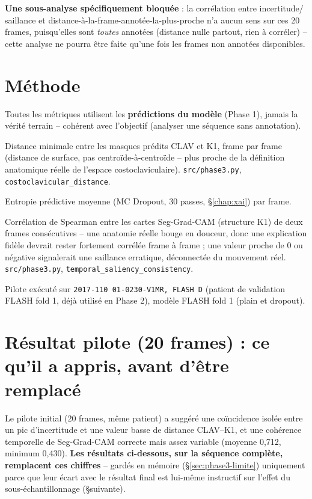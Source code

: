 \documentclass[11pt,a4paper]{report}
\begin{document}
\textbf{Une sous-analyse spécifiquement bloquée} : la corrélation entre incertitude/
saillance et distance-à-la-frame-annotée-la-plus-proche n'a aucun sens sur ces 20
frames, puisqu'elles sont \emph{toutes} annotées (distance nulle partout, rien à
corréler) -- cette analyse ne pourra être faite qu'une fois les frames non
annotées disponibles.

\section{Méthode}

Toutes les métriques utilisent les \textbf{prédictions du modèle} (Phase 1), jamais
la vérité terrain -- cohérent avec l'objectif (analyser une séquence sans
annotation).

\begin{description}[style=nextline]
    \item[Courbe de compression costoclaviculaire] Distance minimale entre les
        masques prédits CLAV et K1, frame par frame (distance de surface, pas
        centroïde-à-centroïde -- plus proche de la définition anatomique réelle de
        l'espace costoclaviculaire). \texttt{src/phase3.py},
        \texttt{costoclavicular\_distance}.
    \item[Incertitude au cours du temps] Entropie prédictive moyenne (MC Dropout,
        30 passes, \S\ref{chap:xai}) par frame.
    \item[Cohérence temporelle de la saillance] Corrélation de Spearman entre les
        cartes Seg-Grad-CAM (structure K1) de deux frames consécutives -- une
        anatomie réelle bouge en douceur, donc une explication fidèle devrait rester
        fortement corrélée frame à frame ; une valeur proche de 0 ou négative
        signalerait une saillance erratique, déconnectée du mouvement réel.
        \texttt{src/phase3.py}, \texttt{temporal\_saliency\_consistency}.
\end{description}

Pilote exécuté sur \texttt{2017-110 01-0230-V1MR, FLASH D} (patient de validation
FLASH fold 1, déjà utilisé en Phase 2), modèle FLASH fold 1 (plain et dropout).

\section{Résultat pilote (20 frames) : ce qu'il a appris, avant d'être remplacé}

Le pilote initial (20 frames, même patient) a suggéré une coïncidence isolée entre
un pic d'incertitude et une valeur basse de distance CLAV--K1, et une cohérence
temporelle de Seg-Grad-CAM correcte mais assez variable (moyenne 0,712, minimum
0,430). \textbf{Les résultats ci-dessous, sur la séquence complète, remplacent ces
chiffres} -- gardés en mémoire (\S\ref{sec:phase3-limite}) uniquement parce que leur
écart avec le résultat final est lui-même instructif sur l'effet du
sous-échantillonnage (\S suivante).
\end{document}
